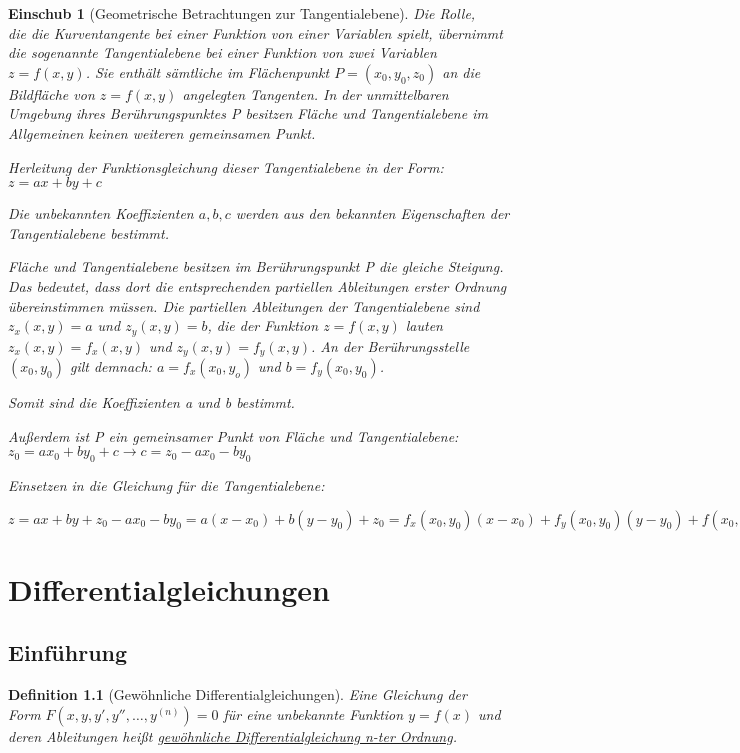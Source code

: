 \documentclass[fontset=ubuntu,12pt,a4paper]{scrreprt}
\newtheorem{defi}{Definition}[section]
\newtheorem*{einschub}{Einschub}
\begin{document}
    \begin{einschub}[Geometrische Betrachtungen zur Tangentialebene]
        Die Rolle, \\
        die die Kurventangente bei einer Funktion von einer Variablen spielt, übernimmt die sogenannte Tangentialebene bei einer Funktion von zwei Variablen \(z=f(x,y)\). Sie enthält sämtliche im Flächenpunkt \(P=(x_0,y_0,z_0)\) an die Bildfläche von \(z=f(x,y)\) angelegten Tangenten. In der unmittelbaren Umgebung ihres Berührungspunktes P besitzen Fläche und Tangentialebene im Allgemeinen keinen weiteren gemeinsamen Punkt.

        Herleitung der Funktionsgleichung dieser Tangentialebene in der Form: \(z=ax+by+c\)

        Die unbekannten Koeffizienten \(a,b,c\) werden aus den bekannten Eigenschaften der Tangentialebene bestimmt.

        Fläche und Tangentialebene besitzen im Berührungspunkt P die gleiche Steigung. Das bedeutet, dass dort die entsprechenden partiellen Ableitungen erster Ordnung über\-ein\-stimmen müssen. Die partiellen Ableitungen der Tangentialebene sind \(z_x(x,y)=a\) und \(z_y(x,y)=b\), die der Funktion \(z=f(x,y)\) lauten \(z_x(x,y)=f_x(x,y)\) und \(z_y(x,y)=f_y(x,y)\). An der Berührungsstelle \((x_0,y_0)\) gilt demnach: \(a=f_x(x_0,y_o)\) und \(b=f_y(x_0,y_0)\).

        Somit sind die Koeffizienten a und b bestimmt.

        Außerdem ist P ein gemeinsamer Punkt von Fläche und Tangentialebene: \(z_0=ax_0+by_0+c \to c=z_0-ax_0-by_0\)

        Einsetzen in die Gleichung für die Tangentialebene:

        \(z=ax+by+z_0-ax_0-by_0 = a(x-x_0)+b(y-y_0)+z_0=f_x(x_0,y_0)(x-x_0)+f_y(x_0,y_0)(y-y_0)+f(x_0,y_0)\)
    \end{einschub}

    \chapter{Differentialgleichungen}
    \section{Einführung}

    \begin{defi}[Gewöhnliche Differentialgleichungen]
        Eine Gleichung der
        \\
        Form \(F(x,y,y',y'',\dots,y^{(n)})=0\) für eine unbekannte Funktion \(y=f(x)\) und deren Ableitungen heißt \underline{gewöhnliche Differentialgleichung n-ter Ordnung}.
    \end{defi}
\end{document}
